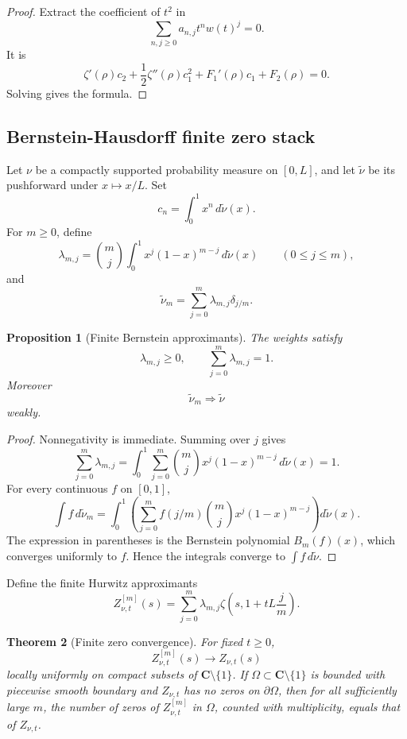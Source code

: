 \documentclass[11pt]{article}
\newcommand{\C}{\mathbf C}
\theoremstyle{plain}
\newtheorem{theorem}{Theorem}[section]
\newtheorem{proposition}[theorem]{Proposition}
\theoremstyle{definition}
\begin{document}
\begin{proof}
Extract the coefficient of \(t^2\) in
\[
   \sum_{n,j\ge0}a_{n,j}t^n w(t)^j=0.
\]
It is
\[
   \zeta'(\rho)c_2+\frac12\zeta''(\rho)c_1^2+F_1'(\rho)c_1+F_2(\rho)=0.
\]
Solving gives the formula.
\end{proof}

\subsection{Bernstein-Hausdorff finite zero stack}

Let \(\nu\) be a compactly supported probability measure on \([0,L]\), and let \(\widetilde\nu\) be its pushforward under \(x\mapsto x/L\).  Set
\[
   c_n=\int_0^1x^n\,d\widetilde\nu(x).
\]
For \(m\ge0\), define
\[
   \lambda_{m,j}=\binom mj\int_0^1 x^j(1-x)^{m-j}\,d\widetilde\nu(x)
   \qquad(0\le j\le m),
\]
and
\[
   \widetilde\nu_m=\sum_{j=0}^m\lambda_{m,j}\delta_{j/m}.
\]

\begin{proposition}[Finite Bernstein approximants]\label{prop:bernstein}
The weights satisfy
\[
   \lambda_{m,j}\ge0,
   \qquad
   \sum_{j=0}^m\lambda_{m,j}=1.
\]
Moreover
\[
   \widetilde\nu_m\Rightarrow \widetilde\nu
\]
weakly.
\end{proposition}

\begin{proof}
Nonnegativity is immediate.  Summing over \(j\) gives
\[
   \sum_{j=0}^m\lambda_{m,j}
   =\int_0^1\sum_{j=0}^m\binom mjx^j(1-x)^{m-j}\,d\widetilde\nu(x)=1.
\]
For every continuous \(f\) on \([0,1]\),
\[
   \int f\,d\widetilde\nu_m
   =\int_0^1\left(\sum_{j=0}^m f(j/m)\binom mjx^j(1-x)^{m-j}\right)d\widetilde\nu(x).
\]
The expression in parentheses is the Bernstein polynomial \(B_m(f)(x)\), which converges uniformly to \(f\).  Hence the integrals converge to \(\int f\,d\widetilde\nu\).
\end{proof}

Define the finite Hurwitz approximants
\[
   Z_{\nu,t}^{[m]}(s)=\sum_{j=0}^m\lambda_{m,j}\zeta\left(s,1+tL\frac jm\right).
\]

\begin{theorem}[Finite zero convergence]\label{thm:finite-zero-stack}
For fixed \(t\ge0\),
\[
   Z_{\nu,t}^{[m]}(s)\to Z_{\nu,t}(s)
\]
locally uniformly on compact subsets of \(\C\setminus\{1\}\).  If \(\Omega\subset\C\setminus\{1\}\) is bounded with piecewise smooth boundary and \(Z_{\nu,t}\) has no zeros on \(\partial\Omega\), then for all sufficiently large \(m\), the number of zeros of \(Z_{\nu,t}^{[m]}\) in \(\Omega\), counted with multiplicity, equals that of \(Z_{\nu,t}\).
\end{theorem}
\end{document}
